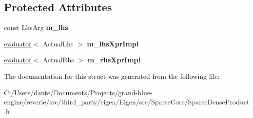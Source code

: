 \subsection*{Protected Attributes}
\begin{DoxyCompactItemize}
\item 
\mbox{\label{struct_eigen_1_1internal_1_1sparse__dense__outer__product__evaluator_ab179fb4ff41a981500a9f1e09a1a36ea}} 
const Lhs\+Arg {\bfseries m\+\_\+lhs}
\item 
\mbox{\label{struct_eigen_1_1internal_1_1sparse__dense__outer__product__evaluator_a0c96dd7449c4225626e20ff76de0c272}} 
\mbox{\hyperlink{struct_eigen_1_1internal_1_1evaluator}{evaluator}}$<$ Actual\+Lhs $>$ {\bfseries m\+\_\+lhs\+Xpr\+Impl}
\item 
\mbox{\label{struct_eigen_1_1internal_1_1sparse__dense__outer__product__evaluator_a0dacd6496a2633c352e6015d5591e7f1}} 
\mbox{\hyperlink{struct_eigen_1_1internal_1_1evaluator}{evaluator}}$<$ Actual\+Rhs $>$ {\bfseries m\+\_\+rhs\+Xpr\+Impl}
\end{DoxyCompactItemize}


The documentation for this struct was generated from the following file\+:\begin{DoxyCompactItemize}
\item 
C\+:/\+Users/dante/\+Documents/\+Projects/grand-\/blue-\/engine/reverie/src/third\+\_\+party/eigen/\+Eigen/src/\+Sparse\+Core/Sparse\+Dense\+Product.\+h\end{DoxyCompactItemize}
